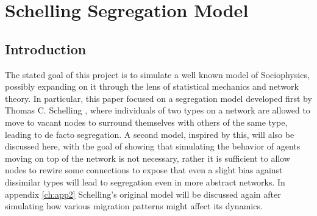 \chapter{Schelling Segregation Model}\label{ch:2}



 

\section{Introduction}

The stated goal of this project is to simulate a well known model of Sociophysics, possibly expanding on it through the lens of statistical mechanics and network theory. In particular, this paper focused on a segregation model developed first by Thomas C. Schelling \cite{schelling_dynamic_1971}, where individuals of two types on a network are allowed to move to vacant nodes to surround themselves with others of the same type, leading to de facto segregation. A second model, inspired by this, will also be discussed here, with the goal of showing that simulating the behavior of agents moving on top of the network is not necessary, rather it is sufficient to allow nodes to rewire some connections to expose that even a slight bias against dissimilar types will lead to segregation even in more abstract networks. In appendix \ref{ch:app2} Schelling's original model will be discussed again after simulating how various migration patterns might affect its dynamics. 

